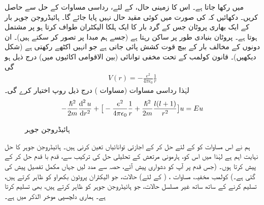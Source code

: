 میں رکھا جاتا ہے۔ اس کا زمینی حال،   کے لئے،  رداسی مساوات کے حل سے حاصل کریں۔ دکھائیں کہ 
 کی صورت میں کوئی مقید حال نہیں پایا جائے گا۔
ہائیڈروجن جوہر بار  کے  ایک بھاری پروٹان جس کے گرد بار  کا ایک ہلکا الیکٹران طواف کرتا ہو پر مشتمل ہوتا ہے۔ پروٹان بنیادی طور پر ساکن رہتا ہے (جسے ہم مبدا پر تصور کر سکتے ہیں)۔  ان دونوں کے مخالف بار کے بیچ قوت کشش پائی جاتی ہے جو انہیں اکٹھے رکھتی ہے  (شکل  دیکھیں)۔  قانون کولمب کے تحت مخفی توانائی (بین الاقوامی اکائیوں میں)  درج ذیل ہو گی  
 \begin{align}\label{مساوات_ابعادی_کولمب_مخفیہ}
V(r)=-\frac{e^{2}}{4\pi\epsilon_{0}}\frac{1}{r} 
\end{align}
لہٰذا رداسی مساوات (مساوات  )  درج ذیل روپ اختیار کرے گی۔
\begin{align}\label{مساوات_ابعادی_رداسی_کولمب}
-\frac{\hslash^{2}}{2m}\frac{\dif^{\,2}{u}}{\dif r^{2}}+\big[-\frac{e^{2}}{4\pi\epsilon_{0}}\frac{1}{r}+\frac{\hslash^{2}}{2m}\frac{l(l+1)}{r^{2}}\big]u=Eu 
\end{align}


\begin{figure}
\centering
{}
\caption{ہائیڈروجن  جوہر}
\label{شکل_تین_ابعادی_ہائیڈروجن_جوہر}
\end{figure}


 ہم نے اس مساوات کو     کے لئے حل کر کے اجازتی توانائیاں  تعین کرنی ہیں۔  ہائیڈروجن جوہر کا حل نہایت اہم ہے لہٰذا میں اس کو، ہارمونی مرتعش کے تحلیلی حل کی ترکیب سے، قدم با قدم حل کر کے پیش کرتا ہوں۔ (جس قدم پر آپ کو دشواری پیش آئے، حصہ  سے مدد لیں جہاں مکمل تفصیل پیش کی گئی ہے۔)  کولمب مخفیہ،  مساوات ،    ( کے لئے)   حالات، جو الیکٹران پروٹون بکھراو کو ظاہر کرتے ہیں، تسلیم کرنے کے ساتھ ساتھ غیر مسلسل  حالات، جو ہائیڈروجن جوہر کو ظاہر کرتے ہیں، بھی تسلیم کرتا ہے۔ ہماری دلچسپی موخر الذکر میں ہے۔

